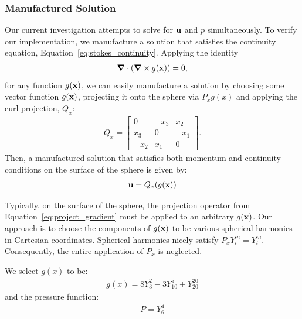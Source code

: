 
\subsubsection{Manufactured Solution}
Our current investigation attempts to solve for $\mathbf{u}$ and $p$ simultaneously. 
To verify our implementation, we manufacture a solution that satisfies the continuity equation, Equation~\ref{eq:stokes_continuity}. Applying the identity
\begin{align*} 
\mbox{\boldmath$ \nabla $} \cdot (\mbox{\boldmath$ \nabla $} \times g(\mathbf{x})) = 0,
\end{align*} 
for any function $g(\mathbf{x})$, we can easily manufacture a solution by choosing some vector function $g(\mathbf{x})$, projecting it onto the sphere via $P_x g(x)$ and applying the curl projection, $Q_x$: 
\begin{align*} 
Q_x = \begin{bmatrix} 0 & -x_3 & x_2 \\ x_3 & 0 & -x_1 \\ -x_2 & x_1 & 0 \end{bmatrix}.
\end{align*} 
Then, a manufactured solution that satisfies both momentum and continuity conditions on the surface of the sphere is given by: 
\begin{align*} 
\mathbf{u} = Q_x (g(\mathbf{x}))
\end{align*} 

Typically, on the surface of the sphere, the projection operator from Equation~\ref{eq:project_gradient} must be applied to an arbitrary $g(\mathbf{x})$. 
Our approach is to choose the components of $g(\mathbf{x})$ to be various spherical harmonics in Cartesian coordinates. Spherical harmonics nicely satisfy $P_x Y_l^m = Y_l^m$. Consequently, the entire application of $P_x$ is neglected. 


We select $g(x)$ to be: 
\begin{align}
g(x) = 8 Y_{3}^{2} - 3Y_{10}^{5} + Y_{20}^{20} 
\end{align}
and the pressure function:
\begin{align}
P = Y_6^4 
\end{align} 

